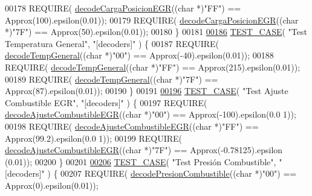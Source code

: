 \begin{DoxyCode}
{{{00178     REQUIRE( \hyperlink{decoders_8cpp_adbe68794075963c37e654d53b8a46f68}{decodeCargaPosicionEGR}((\textcolor{keywordtype}{char} *)\textcolor{stringliteral}{"FF"}) == Approx(100).epsilon(0.01));
00179     REQUIRE( \hyperlink{decoders_8cpp_adbe68794075963c37e654d53b8a46f68}{decodeCargaPosicionEGR}((\textcolor{keywordtype}{char} *)\textcolor{stringliteral}{"7F"}) == Approx(50).epsilon(0.01));
00180 \}
00181 
\hyperlink{UnitTestCase_8cpp_a376ac0e4b8eef0360ec825760e4b6b15}{00186} \hyperlink{UnitTestCase_8cpp_ab1b7b485076e7de68cd9912827a8ee86}{TEST\_CASE}( \textcolor{stringliteral}{"Test Temperatura General"}, \textcolor{stringliteral}{"[decoders]"} ) \{
00187     REQUIRE( \hyperlink{decoders_8cpp_af581438645d7ff67766fa2e5eba5eaf9}{decodeTempGeneral}((\textcolor{keywordtype}{char} *)\textcolor{stringliteral}{"00"}) == Approx(-40).epsilon(0.01));
00188     REQUIRE( \hyperlink{decoders_8cpp_af581438645d7ff67766fa2e5eba5eaf9}{decodeTempGeneral}((\textcolor{keywordtype}{char} *)\textcolor{stringliteral}{"FF"}) == Approx(215).epsilon(0.01));
00189     REQUIRE( \hyperlink{decoders_8cpp_af581438645d7ff67766fa2e5eba5eaf9}{decodeTempGeneral}((\textcolor{keywordtype}{char} *)\textcolor{stringliteral}{"7F"}) == Approx(87).epsilon(0.01));
00190 \}
00191 
\hyperlink{UnitTestCase_8cpp_afd7d9244b2b8c27b86ea397d397a6cf6}{00196} \hyperlink{UnitTestCase_8cpp_ab1b7b485076e7de68cd9912827a8ee86}{TEST\_CASE}( \textcolor{stringliteral}{"Test Ajuste Combustible EGR"}, \textcolor{stringliteral}{"[decoders]"} ) \{
00197     REQUIRE( \hyperlink{decoders_8cpp_aeee9e6d8511a934b3a3644b19de3f2b7}{decodeAjusteCombustibleEGR}((\textcolor{keywordtype}{char} *)\textcolor{stringliteral}{"00"}) == Approx(-100).epsilon(0.0
      1));
00198     REQUIRE( \hyperlink{decoders_8cpp_aeee9e6d8511a934b3a3644b19de3f2b7}{decodeAjusteCombustibleEGR}((\textcolor{keywordtype}{char} *)\textcolor{stringliteral}{"FF"}) == Approx(99.2).epsilon(0.0
      1));
00199     REQUIRE( \hyperlink{decoders_8cpp_aeee9e6d8511a934b3a3644b19de3f2b7}{decodeAjusteCombustibleEGR}((\textcolor{keywordtype}{char} *)\textcolor{stringliteral}{"7F"}) == Approx(-0.78125).epsilon
      (0.01));
00200 \}
00201 
\hyperlink{UnitTestCase_8cpp_ae4019c68e76a6f985cf7295357db9853}{00206} \hyperlink{UnitTestCase_8cpp_ab1b7b485076e7de68cd9912827a8ee86}{TEST\_CASE}( \textcolor{stringliteral}{"Test Presión Combustible"}, \textcolor{stringliteral}{"[decoders]"} ) \{
00207     REQUIRE( \hyperlink{decoders_8cpp_ab1c03e72734d4127a1c48f3b5a44a2e2}{decodePresionCombustible}((\textcolor{keywordtype}{char} *)\textcolor{stringliteral}{"00"}) == Approx(0).epsilon(0.01));
}}}
\end{DoxyCode}
